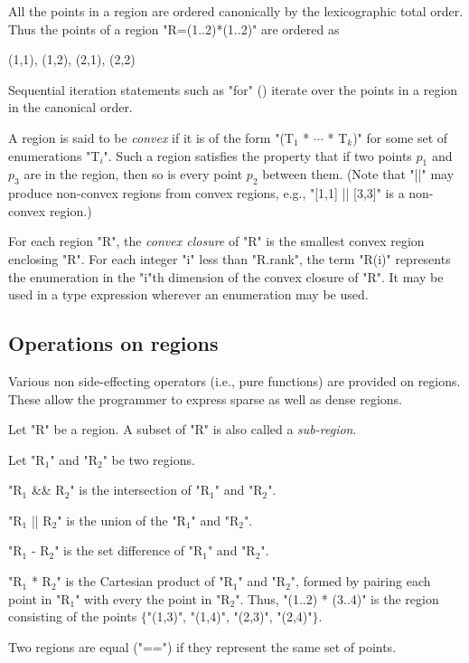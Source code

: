 All the points in a region are ordered canonically by the
lexicographic total order. Thus the points of a region \xcd"R=(1..2)*(1..2)"
are ordered as 
\begin{xten}
(1,1), (1,2), (2,1), (2,2)
\end{xten}
Sequential iteration statements such as \xcd"for" ()
iterate over the points in a region in the canonical order.

A region is said to be {\em convex} if it is of
the form \xcdmath"(T$_1$ * $\cdots$ * T$_k$)" for some set of enumerations
\xcdmath"T$_i$". Such a
region satisfies the property that if two points $p_1$ and $p_3$ are
in the region, then so is every point $p_2$ between them. (Note that
\xcd"||" may produce non-convex regions from convex regions, e.g.,
\xcd"[1,1] || [3,3]" is a non-convex region.)

For each region \xcd"R", the {\em convex closure} of \xcd"R" is the
smallest convex region enclosing \xcd"R".  For each integer \xcd"i"
less than \xcd"R.rank", the term \xcd"R(i)" represents the enumeration
in the \xcd"i"th dimension of the convex closure of \xcd"R". It may be
used in a type expression wherever an enumeration may be used.

\subsection{Operations on regions}
Various non side-effecting operators (i.e., pure functions) are
provided on regions. These allow the programmer to express sparse as
well as dense regions.

Let \xcd"R" be a region. A subset of \xcd"R" is also called a
{\em sub-region}.

Let \xcdmath"R$_1$" and \xcdmath"R$_2$" be two regions.

\xcdmath"R$_1$ && R$_2$" is the intersection of \xcdmath"R$_1$" and
\xcdmath"R$_2$".

\xcdmath"R$_1$ || R$_2$" is the union of the \xcdmath"R$_1$" and
\xcdmath"R$_2$".

\xcdmath"R$_1$ - R$_2$" is the set difference of \xcdmath"R$_1$" and
\xcdmath"R$_2$".

\xcdmath"R$_1$ * R$_2$" is the Cartesian product of \xcdmath"R$_1$" and
\xcdmath"R$_2$", 
formed by pairing each point in \xcdmath"R$_1$"
with every the point in \xcdmath"R$_2$".
Thus, \xcd"(1..2) * (3..4)"
is the region consisting of the points
$\{$\xcd"(1,3)", \xcd"(1,4)", \xcd"(2,3)", \xcd"(2,4)"$\}$.

Two regions are equal (\xcd"==") if they represent the same set of
points.

